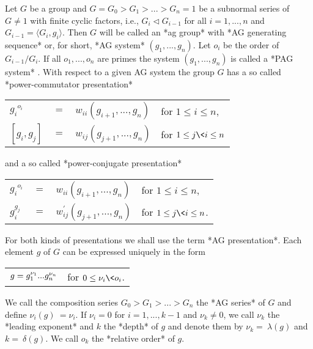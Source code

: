 
Let $G$ be a group and $G  = G_0 >  G_1 > ...  >  G_n = 1$ be a subnormal
series of $G \neq 1$ with finite cyclic factors, i.e., $G_i \lhd G_{i-1}$
for all $i=1, ..., n$ and $G_{i-1} = \langle G_i, g_i \rangle$.  Then $G$
will  be  called  an  *ag group*    with  *AG  generating
sequence*    or,  for short,  *AG system*
 $(g_1,  ..., g_n)$. Let $o_i$ be the  order of $G_{i-1}
/ G_i$. If all $o_1, ..., o_n$ are primes the system $(g_1, ..., g_n)$ is
called a  *PAG system*  .  With respect to  a given  AG
system the group $G$ has a so called *power-commutator presentation*

\begin{center}
  \begin{tabular}{lcll}
    ${g_i}^{o_i}$ & $=$ & $w_{ii}(g_{i+1},..., g_n)$ &
      for $1\leq i\leq n$,\\
    $[g_i,g_j]$ & $=$ & $w_{ij}(g_{j+1},...,g_n)$ &
      for $1\leq j\< i\leq n$\\
  \end{tabular}
\end{center}

and a so called *power-conjugate presentation*

\begin{center}
  \begin{tabular}{lcll}
    ${g_i}^{o_i}$ & $=$ & $w_{ii}(g_{i+1},..., g_n)$ & 
      for $1\leq i\leq n$,\\
    $g_i^{g_j}$ & $=$ & $w^{\prime}_{ij}(g_{j+1},...,g_n)$ &
      for $1\leq j\< i\leq n$.\\
  \end{tabular}
\end{center}

For both kinds of presentations we shall use  the term *AG presentation*.
Each element $g$ of $G$ can be expressed uniquely in the form

\begin{center}
  \begin{tabular}{cc}
    $g = g_1^{\nu_1}\* ...\* g_n^{\nu_n}$ & for $0 \leq \nu_i \< o_i$.
  \end{tabular}
\end{center}

We call the composition series $G_0 > G_1 > ... > G_n$ the *AG series* of
$G$ and define $\nu_i( g ) \:= \nu_i$.  If  $\nu_i = 0$ for  $i = 1, ...,
k-1$ and $\nu_k  \neq 0$, we call $\nu_k$  the *leading exponent* and $k$
the *depth* of $g$ and denote them by $\nu_k =\: \lambda( g )$ and $k =\:
\delta( g )$.  We call $o_k$ the *relative order* of $g$.

